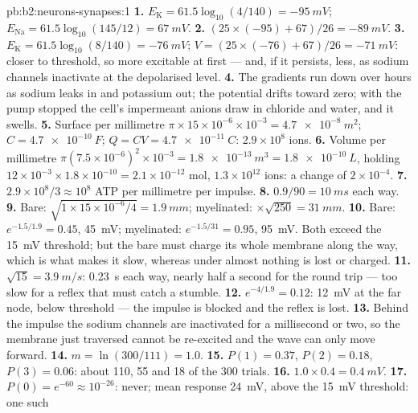 \begin{solution}{pb:b2:neurons-synapses:1}
\textbf{1.} $E_{\mathrm K} = 61.5\log_{10}(4/140) = \qty{-95}{mV}$;
$E_{\mathrm{Na}} = 61.5\log_{10}(145/12) = \qty{+67}{mV}$.
\textbf{2.} $(25\times(-95) + 67)/26 = \qty{-89}{mV}$.
\textbf{3.} $E_{\mathrm K} = 61.5\log_{10}(8/140) = \qty{-76}{mV}$;
$V = (25\times(-76) + 67)/26 = \qty{-71}{mV}$: closer to threshold,
so more excitable at first --- and, if it persists, less, as sodium
channels inactivate at the depolarised level.
\textbf{4.} The gradients run down over hours as sodium leaks in and
potassium out; the potential drifts toward zero; with the pump
stopped the cell's impermeant anions draw in chloride and water,
and it swells.
\textbf{5.} Surface per millimetre $\pi\times 15\times 10^{-6}\times
10^{-3} = \qty{4.7e-8}{m^2}$; $C = \qty{4.7e-10}{F}$; $Q = CV =
\qty{4.7e-11}{C}$: $2.9\times 10^{8}$ ions.
\textbf{6.} Volume per millimetre $\pi(7.5\times 10^{-6})^{2}\times
10^{-3} = \qty{1.8e-13}{m^3} = \qty{1.8e-10}{L}$, holding $12\times
10^{-3}\times 1.8\times 10^{-10} = 2.1\times 10^{-12}$ mol, $1.3\times
10^{12}$ ions: a change of $2\times 10^{-4}$.
\textbf{7.} $2.9\times 10^{8}/3 \approx 10^{8}$ ATP per millimetre per
impulse.
\textbf{8.} $0.9/90 = \qty{10}{ms}$ each way.
\textbf{9.} Bare: $\sqrt{1\times 15\times 10^{-6}/4} = \qty{1.9}{mm}$;
myelinated: $\times\sqrt{250} = \qty{31}{mm}$.
\textbf{10.} Bare: $e^{-1.5/1.9} = 0.45$, \qty{45}{mV}; myelinated:
$e^{-1.5/31} = 0.95$, \qty{95}{mV}. Both exceed the \qty{15}{mV}
threshold; but the bare  must charge its whole membrane along
the way, which is what makes it slow, whereas under  almost
nothing is lost or charged.
\textbf{11.} $\sqrt{15} = \qty{3.9}{m/s}$: \qty{0.23}{s} each way,
nearly half a second for the round trip --- too slow for a reflex
that must catch a stumble.
\textbf{12.} $e^{-4/1.9} = 0.12$: \qty{12}{mV} at the far node, below
threshold --- the impulse is blocked and the reflex is lost.
\textbf{13.} Behind the impulse the sodium channels are inactivated
for a millisecond or two, so the membrane just traversed cannot be
re-excited and the wave can only move forward.
\textbf{14.} $m = \ln(300/111) = 1.0$.
\textbf{15.} $P(1) = 0.37$, $P(2) = 0.18$, $P(3) = 0.06$: about 110, 55
and 18 of the 300 trials.
\textbf{16.} $1.0\times 0.4 = \qty{0.4}{mV}$.
\textbf{17.} $P(0) = e^{-60} \approx 10^{-26}$: never; mean response
\qty{24}{mV}, above the \qty{15}{mV} threshold: one such 

\end{solution}
